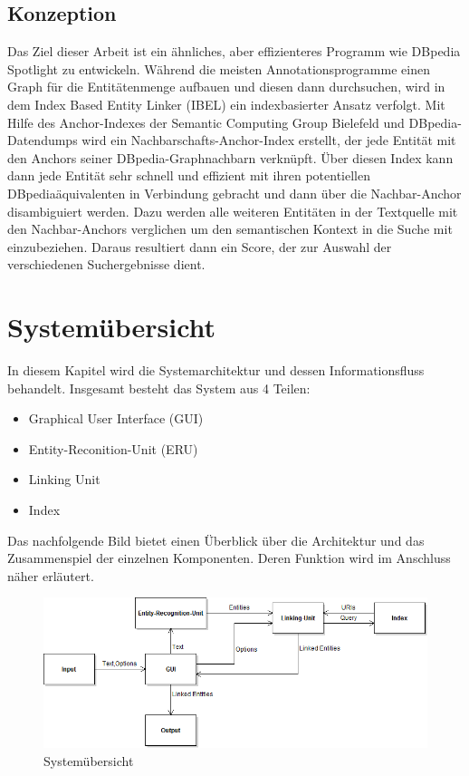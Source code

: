 \documentclass[11pt, a4paper, oneside]{Thesis} %
\begin{document}
\section{Konzeption}
Das Ziel dieser Arbeit ist ein \"ahnliches, aber effizienteres Programm wie DBpedia Spotlight zu entwickeln. W\"ahrend die meisten Annotationsprogramme einen Graph f\"ur die Entit\"atenmenge aufbauen und diesen dann durchsuchen, wird in dem Index Based Entity Linker (IBEL) ein indexbasierter Ansatz verfolgt. Mit Hilfe des Anchor-Indexes der Semantic Computing Group Bielefeld und DBpedia-Datendumps wird ein Nachbarschafts-Anchor-Index erstellt, der jede Entit\"at mit den Anchors seiner DBpedia-Graphnachbarn verkn\"upft. \"Uber diesen Index kann dann jede Entit\"at sehr schnell und effizient mit ihren potentiellen DBpedia\"aquivalenten in Verbindung gebracht und dann \"uber die Nachbar-Anchor disambiguiert werden. Dazu werden alle weiteren Entit\"aten in der Textquelle mit den Nachbar-Anchors verglichen um den semantischen Kontext in die Suche mit einzubeziehen. Daraus resultiert dann ein Score, der zur Auswahl der verschiedenen Suchergebnisse dient.

\chapter{System\"ubersicht}
\label{Kapitel 2}

In diesem Kapitel wird die Systemarchitektur und dessen Informationsfluss behandelt. Insgesamt besteht das System aus 4 Teilen:
\begin{itemize}
\item Graphical User Interface (GUI)
\item Entity-Reconition-Unit (ERU)
\item Linking Unit
\item Index
\end{itemize}
Das nachfolgende Bild bietet einen \"Uberblick \"uber die Architektur und das Zusammenspiel der einzelnen Komponenten. Deren Funktion wird im Anschluss n\"aher erl\"autert.
\begin{figure}[ht]
\centering
\includegraphics[scale=0.55]{./system.png}
\caption[System\"ubersicht]{System\"ubersicht}
\end{figure}
\end{document}
